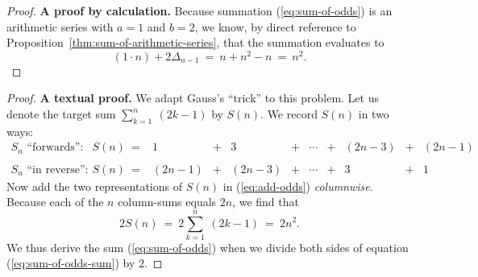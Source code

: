 \medskip

\begin{proof}
{\bf A proof by calculation.}
%
Because summation (\ref{eq:sum-of-odds}) is an arithmetic series with
$a=1$ and $b=2$, we know, by direct reference to
Proposition~\ref{thm:sum-of-arithmetic-series}, that the summation
evaluates to
\[ (1 \cdot n) + 2 \Delta_{n-1} \ = \ n + n^2 -n \ = \ n^2. \]
\end{proof}


\medskip

\begin{proof}
{\bf A textual proof.}
%
We adapt Gauss's ``trick'' to this problem.  Let us denote the target
sum $\sum_{k=1}^n \ (2k-1)$ by $S(n)$.  We record $S(n)$ in two ways:
\begin{equation}
\label{eq:add-odds}
\begin{array}{llccccccccc}
\mbox{$S_n$ ``forwards'':} &
S(n) \ = 
& 1 & + & 3 & + & \cdots & + & (2n-3) & + & (2n-1) \\
 & & & & & & & & & &  \\
\mbox{$S_n$ ``in reverse'':} &
S(n) \ =
& (2n-1) & + & (2n-3) & + & \cdots & + & 3 & + & 1
\end{array}
\end{equation}
Now add the two representations of $S(n)$ in (\ref{eq:add-odds}) {\em
  columnwise}.  Because each of the $n$ column-sums equals $2n$, we
find that
\begin{equation}
\label{eq:sum-of-odds-sum}
2 S(n) \ = \ 2 \sum_{k=1}^n \ (2k-1) \ = \ 2n^2.
\end{equation}
We thus derive the sum (\ref{eq:sum-of-odds}) when we divide both
sides of equation (\ref{eq:sum-of-odds-sum}) by $2$.
\end{proof}

\medskip

